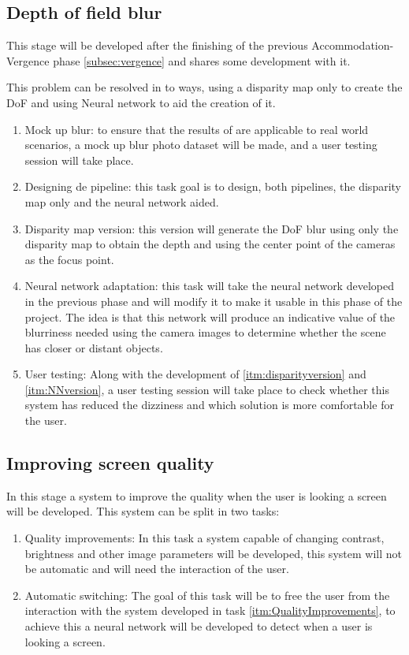 \documentclass[10pt,a4paper,twocolumn,twoside]{article}
\begin{document}
	\subsection{Depth of field blur}
	This stage will be developed after the finishing of the previous Accommodation-Vergence phase \ref{subsec:vergence} and shares some development with it. 
	
	This problem can be resolved in to ways, using a disparity map only to create the DoF and using Neural network to aid the creation of it.
	
	\begin{enumerate}
		\item Mock up blur: to ensure that the results of \cite{ifftConfortDoF} are applicable to real world scenarios, a mock up blur photo dataset will be made, and a user testing session will take place.
		
		\item Designing de pipeline: this task goal is to design, both pipelines, the disparity map only and the neural network aided.
		
		\item \label{itm:disparityversion} Disparity map version: this version will generate the DoF blur using only the disparity map to obtain the depth and using the center point of the cameras as the focus point.
		
		\item \label{itm:NNversion} Neural network adaptation: this task will take the neural network developed in the previous phase and will modify it to make it usable in this phase of the project. The idea is that this network will produce an indicative value of the blurriness needed using the camera images to determine whether the scene has closer or distant objects.
		
		\item User testing: Along with the development of \ref{itm:disparityversion} and \ref{itm:NNversion}, a user testing session will take place to check whether this system has reduced the dizziness and which solution is more comfortable for the user.
	\end{enumerate}
	
	\subsection{Improving screen quality}
	In this stage a system to improve the quality when the user is looking a screen will be developed. This system can be split in two tasks:
	\begin{enumerate}
		\item \label{itm:QualityImprovements} Quality improvements: In this task a system capable of changing contrast, brightness and other image parameters will be developed, this system will not be automatic and will need the interaction of the user.
		
		\item Automatic switching: The goal of this task will be to free the user from the interaction with the system developed in task \ref{itm:QualityImprovements}, to achieve this a neural network will be developed to detect when a user is looking a screen.
	\end{enumerate}
	
\end{document}
